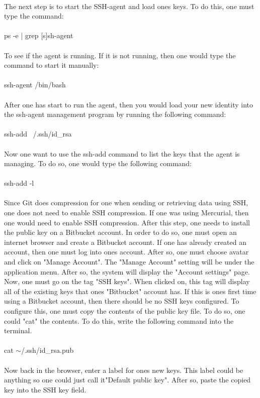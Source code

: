 \documentclass{article}
\begin{document}
\begin{enumerate}
\\
The next step is to start the SSH-agent and load ones keys. To do this, one must type the command:
\\
\\
ps -e | grep [s]sh-agent
\\
\\
To see if the agent is running. If it is not running, then one would type the command to start it manually:
\\
\\
ssh-agent /bin/bash
\\
\\
After one has start to run the agent, then you would load your new identity into the ssh-agent management program by running the following command:
\\
\\
ssh-add ~/.ssh/id\_rsa
\\
\\
Now one want to use the ssh-add command to list the keys that the agent is managing. To do so, one would type the following command:
\\
\\
ssh-add -l
\\
\\
Since Git does compression for one when sending or retrieving data using SSH, one does not need to enable SSH compression. If one was using Mercurial, then one would need to enable SSH compression. After this step, one needs to install the public key on a Bitbucket account. In order to do so, one must open an internet browser and create a Bitbucket account. If one has already created an account, then one must log into ones account. After so, one must choose avatar and click on "Manage Account". The "Manage Account" setting will be under the application menu. After so, the system will display the "Account settings" page. Now, one must go on the tag "SSH keys". When clicked on, this tag will display all of the existing keys that ones "Bitbucket" account has. If this is ones first time using a Bitbucket account, then there should be no SSH keys configured. To configure this, one must copy the contents of the public key file. To do so, one could "cat" the contents. To do this, write the following command into the terminal.
\\
\\
cat $\sim$/.ssh/id\_rsa.pub
\\
\\
Now back in the browser, enter a label for ones new keys. This label could be anything so one could just call it"Default public key". After so, paste the copied key into the SSH key field.

\end{enumerate}
\end{document}
